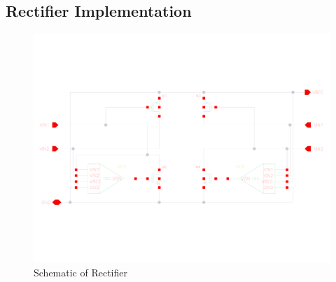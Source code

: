 \documentclass[12pt,a4paper,UKenglish]{report}
\begin{document}
\begin{appendices} 	%
\makeatletter
{}
\makeatother

\chapter{Rectifier Implementation}

\begin{figure} [!htbp]
 	\centering
  	\includegraphics[width=1\textwidth]{appendix/schematic_rectifier_l.pdf} 
 	\caption{Schematic of Rectifier} 
	\label{fig:appen_schematic_rectifer} 
\end{figure}




\end{appendices}
\end{document}
